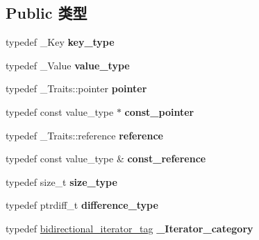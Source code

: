 \subsection*{Public 类型}
\begin{DoxyCompactItemize}
\item 
\mbox{\label{class___rb__tree_a00251b0f4d762cb04f3c90ed7128bca4}} 
typedef \+\_\+\+Key {\bfseries key\+\_\+type}
\item 
\mbox{\label{class___rb__tree_a27000a2b9c860b61b0a9e9ba04eb9d70}} 
typedef \+\_\+\+Value {\bfseries value\+\_\+type}
\item 
\mbox{\label{class___rb__tree_a99ecb0a7a572ca1e81611f43f8dce463}} 
typedef \+\_\+\+Traits\+::pointer {\bfseries pointer}
\item 
\mbox{\label{class___rb__tree_aad7a09ff3d72197c66531488ccc26100}} 
typedef const value\+\_\+type $\ast$ {\bfseries const\+\_\+pointer}
\item 
\mbox{\label{class___rb__tree_a6f1620702c5564777d7f1297e64c899e}} 
typedef \+\_\+\+Traits\+::reference {\bfseries reference}
\item 
\mbox{\label{class___rb__tree_ad01a3ade0a97e99c15f6e9523c5325df}} 
typedef const value\+\_\+type \& {\bfseries const\+\_\+reference}
\item 
\mbox{\label{class___rb__tree_a266fe40f125489c3d24cd940439aeb5a}} 
typedef size\+\_\+t {\bfseries size\+\_\+type}
\item 
\mbox{\label{class___rb__tree_a0082dafe3db310d3d2790b557c27faac}} 
typedef ptrdiff\+\_\+t {\bfseries difference\+\_\+type}
\item 
\mbox{\label{class___rb__tree_a97fb2ca0096cd72fcd5ddce9da19afd0}} 
typedef \hyperlink{structbidirectional__iterator__tag}{bidirectional\+\_\+iterator\+\_\+tag} {\bfseries \+\_\+\+Iterator\+\_\+category}
\item 
\mbox{\label{class___rb__tree_a84353ea35eed62ede964a2a9058da966}} 

\end{DoxyCompactItemize}
